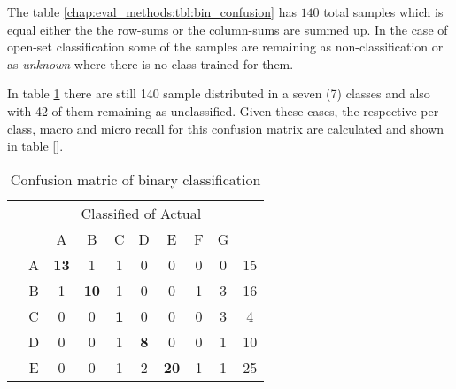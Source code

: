 {The table \ref{chap:eval_methods:tbl:bin_confusion} has $140$ total samples which is equal either the the row-sums or the column-sums are summed up. In the case of open-set classification some of the samples are remaining as non-classification or as \textit{unknown} where there is no class trained for them. 

In table \ref{chap:eval_methods:tbl:multi_confusion} there are still 140 sample distributed in a seven (7) classes and also with 42 of them remaining as unclassified. Given these cases, the respective per class, macro and micro recall for this confusion matrix are calculated and shown in table \ref{}.

\begin{table}[H]
	\center
	\caption{Confusion matric of binary classification}\label{chap:eval_methods:tbl:multi_confusion}
	\begin{tabular}{c c c c c c c c c c}
		& & \multicolumn{7}{c}{Classified of Actual} & \\
		\cline{3-9}
		\multirow{9}{*}{\rotatebox[origin=c]{90}{Predicted}} & & \multicolumn{1}{|c}{A} & \multicolumn{1}{c}{B} & \multicolumn{1}{c}{C} & \multicolumn{1}{c}{D} & \multicolumn{1}{c}{E}  & \multicolumn{1}{c}{F} & \multicolumn{1}{c|}{G} & \\
		\cline{2-9}
		& \multicolumn{1}{|c}{A} & \multicolumn{1}{|c}{\textbf{13}} & \multicolumn{1}{c}{1} & \multicolumn{1}{c}{1} & \multicolumn{1}{c}{0} & \multicolumn{1}{c}{0} & \multicolumn{1}{c}{0} & \multicolumn{1}{c|}{0} & 15 \\
		& \multicolumn{1}{|c}{B} & \multicolumn{1}{|c}{1} & \multicolumn{1}{c}{\textbf{10}} & \multicolumn{1}{c}{1} & \multicolumn{1}{c}{0} & \multicolumn{1}{c}{0} & \multicolumn{1}{c}{1} & \multicolumn{1}{c|}{3} & 16 \\
		& \multicolumn{1}{|c}{C} & \multicolumn{1}{|c}{0} & \multicolumn{1}{c}{0} & \multicolumn{1}{c}{\textbf{1}} & \multicolumn{1}{c}{0} & \multicolumn{1}{c}{0} & \multicolumn{1}{c}{0} & \multicolumn{1}{c|}{3} & 4 \\
		& \multicolumn{1}{|c}{D} & \multicolumn{1}{|c}{0} & \multicolumn{1}{c}{0} & \multicolumn{1}{c}{1} & \multicolumn{1}{c}{\textbf{8}} & \multicolumn{1}{c}{0} & \multicolumn{1}{c}{0} & \multicolumn{1}{c|}{1} & 10 \\
		& \multicolumn{1}{|c}{E} & \multicolumn{1}{|c}{0} & \multicolumn{1}{c}{0} & \multicolumn{1}{c}{1} & \multicolumn{1}{c}{2} & \multicolumn{1}{c}{\textbf{20}} & \multicolumn{1}{c}{1} & \multicolumn{1}{c|}{1} & 25 \\

\end{tabular}
\end{table}}
